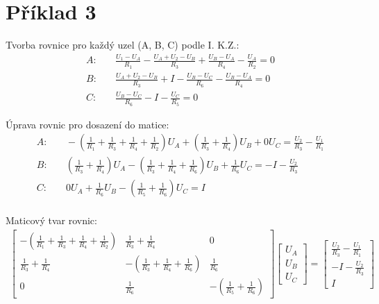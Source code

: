 \section{Příklad 3}


Tvorba rovnice pro každý uzel (A, B, C) podle I. K.Z.:
\nopagebreak
\begin{align*}
A: & \quad
\frac{U_1 - U_A}{R_1} - \frac{U_A + U_2 - U_B}{R_3} + \frac{U_B - U_A}{R_4} - \frac{U_A}{R_2} = 0 \\
B: & \quad \frac{U_A + U_2 - U_B}{R_3} + I - \frac{U_B - U_C}{R_6} - \frac{U_B - U_A}{R_4} = 0 \\
C: & \quad \frac{U_B - U_C}{R_6} - I - \frac{U_C}{R_5} = 0
\end{align*}

Úprava rovnic pro dosazení do matice:
\nopagebreak
\begin{align*}
A: & \quad
- (\frac{1}{R_1} + \frac{1}{R_3} + \frac{1}{R_4} + \frac{1}{R_2})U_A
+ (\frac{1}{R_3} + \frac{1}{R_4})U_B
+ 0 U_C
= \frac{U_2}{R_3} - \frac{U_1}{R_1} \\
B: & \quad
(\frac{1}{R_3} + \frac{1}{R_4})U_A
- (\frac{1}{R_3} + \frac{1}{R_4} + \frac{1}{R_6})U_B
+ \frac{1}{R_6} U_C
= -I-\frac{U_2}{R_3} \\
C: & \quad
0 U_A
+ \frac{1}{R_6}U_B
- (\frac{1}{R_5} + \frac{1}{R_6})U_C
= I \\
\end{align*}

Maticový tvar rovnic:
\nopagebreak
\begin{align*}
\begin{bmatrix}
-\left(\frac{1}{R_1} + \frac{1}{R_3} + \frac{1}{R_4} + \frac{1}{R_2}\right) & \frac{1}{R_3} + \frac{1}{R_4} & 0 \\
\frac{1}{R_3} + \frac{1}{R_4} & -\left(\frac{1}{R_3} + \frac{1}{R_4} + \frac{1}{R_6}\right) & \frac{1}{R_6} \\
0 & \frac{1}{R_6} & -\left(\frac{1}{R_5} + \frac{1}{R_6}\right)
\end{bmatrix}
\begin{bmatrix}
U_A \\ U_B \\ U_C
\end{bmatrix}
=
\begin{bmatrix}
\frac{U_2}{R_3} - \frac{U_1}{R_1} \\
-I - \frac{U_2}{R_3} \\
I
\end{bmatrix}
\end{align*}

